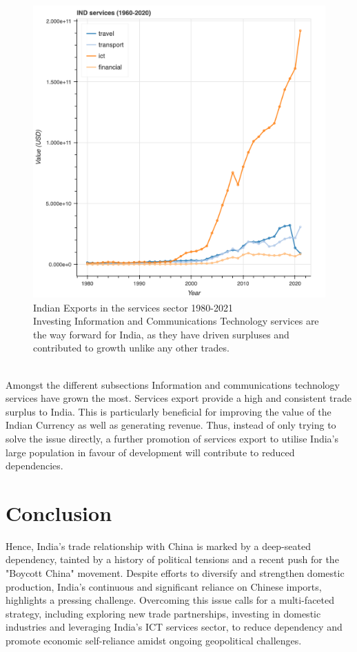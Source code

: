 \documentclass{article}
\begin{document}
\begin{itemize}[nosep , left=0pt , topsep=0pt]
\begin{figure}[htp]
\begin{minipage}{.5\textwidth}
              \includegraphics[width=.9\linewidth]{ind_services_1960_2020.png}
              \captionsetup{skip=0pt,font=small} %
                \caption{Indian Exports in the services sector 1980-2021
                \\Investing Information and Communications Technology services are the way forward for India, as they have driven surpluses and contributed to growth unlike any other trades.}
              \label{fig:test2}
            \end{minipage}
            \end{figure}
            \\
            Amongst the different subsections Information and communications technology services have grown the most. Services export provide a high and consistent trade surplus to India. This is particularly beneficial for improving the value of the Indian Currency as well as generating revenue. Thus, instead of only trying to solve the issue directly, a further promotion of services export to utilise India’s large population in favour of development will contribute to reduced dependencies.

    \end{itemize} 

\section*{Conclusion}
Hence, India's trade relationship with China is marked by a deep-seated dependency, tainted by a history of political tensions and a recent push for the "Boycott China" movement. Despite efforts to diversify and strengthen domestic production, India's continuous and significant reliance on Chinese imports, highlights a pressing challenge. Overcoming this issue calls for a multi-faceted strategy, including exploring new trade partnerships, investing in domestic industries and leveraging India's ICT services sector, to reduce dependency and promote economic self-reliance amidst ongoing geopolitical challenges.
\end{document}
